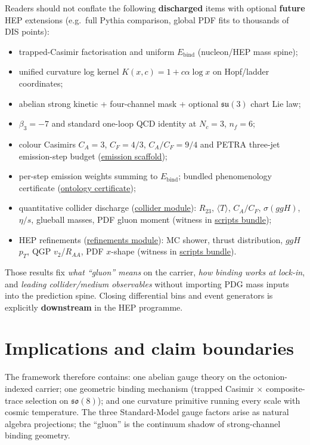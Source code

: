 \documentclass[11pt]{amsart}
\begin{document}
Readers should not conflate the following \textbf{discharged} items with optional
\textbf{future} HEP extensions (e.g.\ full Pythia comparison, global PDF fits to
thousands of DIS points):
\begin{itemize}[nosep]
\item trapped-Casimir factorisation and uniform $E_{\mathrm{bind}}$ (nucleon/HEP mass spine);
\item unified curvature log kernel $K(x,c)=1+c\alpha\log x$ on Hopf/ladder coordinates;
\item abelian strong kinetic + four-channel mask + optional $\mathfrak{su}(3)$ chart Lie law;
\item $\beta_3=-7$ and standard one-loop QCD identity at $N_c=3$, $n_f=6$;
\item colour Casimirs $C_A=3$, $C_F=4/3$, $C_A/C_F=9/4$ and PETRA three-jet
  \cite{bartel1979,berger1979} emission-step
  budget (\hyperref[lean:emission-scaffold]{emission scaffold});
\item per-step emission weights summing to $E_{\mathrm{bind}}$; bundled phenomenology certificate
  (\hyperref[lean:gluon-closure]{ontology certificate});
\item quantitative collider discharge (\hyperref[lean:collider-discharge]{collider module}):
  $R_{23}$, $\langle T\rangle$, $C_A/C_F$, $\sigma(ggH)$, $\eta/s$, glueball masses,
  PDF gluon moment (witness in \hyperref[lean:scripts-bundle]{scripts bundle});
\item HEP refinements (\hyperref[lean:hep-refinements]{refinements module}): MC shower,
  thrust distribution, $ggH$ $p_T$, QGP $v_2$/$R_{AA}$, PDF $x$-shape (witness in
  \hyperref[lean:scripts-bundle]{scripts bundle}).
\end{itemize}
Those results fix \emph{what ``gluon'' means} on the carrier, \emph{how binding
works at lock-in}, and \emph{leading collider/medium observables} without importing
PDG mass inputs into the prediction spine.  Closing differential bins and event
generators is explicitly \textbf{downstream} in the HEP programme.

\section{Implications and claim boundaries}
\label{sec:boundaries}

The framework therefore contains: one abelian gauge theory on the octonion-indexed
carrier; one geometric binding mechanism (trapped Casimir $\times$ composite-trace
selection on $\mathfrak{so}(8)$); and one curvature primitive running every scale
with cosmic temperature. The three Standard-Model gauge factors arise as natural
algebra projections; the ``gluon'' is the continuum shadow of strong-channel binding
geometry.
\end{document}
